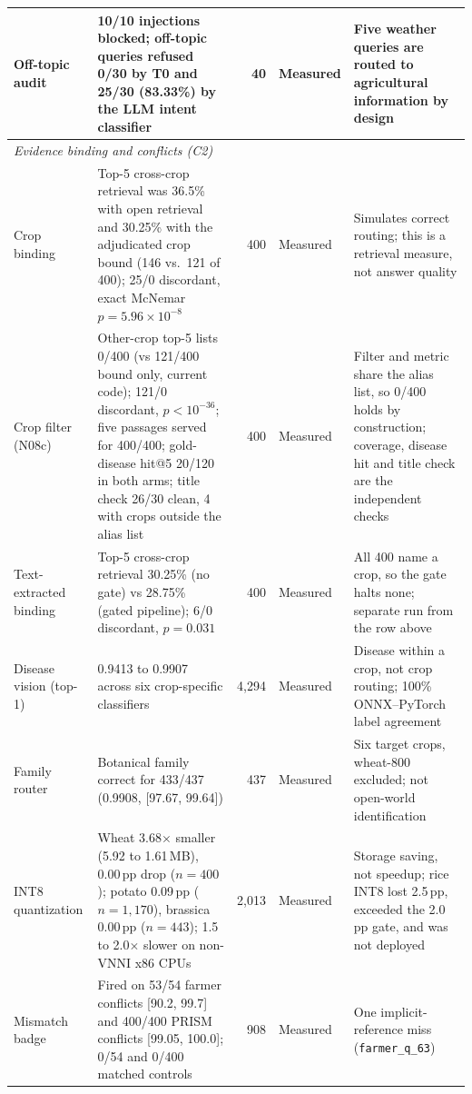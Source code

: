 \documentclass[11pt,a4paper]{article}
\begin{document}
\begin{minipage}{\textwidth}
\begin{tabularx}{\textwidth}{@{}p{} p{} r p{} X@{}}
Off-topic audit & 10/10 injections blocked; off-topic queries refused 0/30 by T0 and 25/30 (83.33\%) by the LLM intent classifier & 40 & Measured & Five weather queries are routed to agricultural information by design \\
\midrule
\multicolumn{5}{l}{\textit{Evidence binding and conflicts (C2)}} \\
Crop binding & Top-5 cross-crop retrieval was 36.5\% with open retrieval and 30.25\% with the adjudicated crop bound (146 vs.\ 121 of 400); 25/0 discordant, exact McNemar $p=5.96\times10^{-8}$ & 400 & Measured & Simulates correct routing; this is a retrieval measure, not answer quality \\
Crop filter (N08c) & Other-crop top-5 lists 0/400 (vs 121/400 bound only, current code); 121/0 discordant, $p < 10^{-36}$; five passages served for 400/400; gold-disease hit@5 20/120 in both arms; title check 26/30 clean, 4 with crops outside the alias list & 400 & Measured & Filter and metric share the alias list, so 0/400 holds by construction; coverage, disease hit and title check are the independent checks \\
Text-extracted binding & Top-5 cross-crop retrieval 30.25\% (no gate) vs 28.75\% (gated pipeline); 6/0 discordant, $p = 0.031$ & 400 & Measured & All 400 name a crop, so the gate halts none; separate run from the row above \\
Disease vision (top-1) & 0.9413 to 0.9907 across six crop-specific classifiers & 4,294 & Measured & Disease within a crop, not crop routing; 100\% ONNX--PyTorch label agreement \\
Family router & Botanical family correct for 433/437 (0.9908, [97.67, 99.64]) & 437 & Measured & Six target crops, wheat-800 excluded; not open-world identification \\
INT8 quantization & Wheat 3.68$\times$ smaller (5.92 to 1.61\,MB), 0.00\,pp drop ($n=400$); potato 0.09\,pp ($n=1{,}170$), brassica 0.00\,pp ($n=443$); 1.5 to 2.0$\times$ slower on non-VNNI x86 CPUs & 2,013 & Measured & Storage saving, not speedup; rice INT8 lost 2.5\,pp, exceeded the 2.0\,pp gate, and was not deployed \\
Mismatch badge & Fired on 53/54 farmer conflicts [90.2, 99.7] and 400/400 PRISM conflicts [99.05, 100.0]; 0/54 and 0/400 matched controls & 908 & Measured & One implicit-reference miss (\texttt{farmer\_q\_63}) \\
\bottomrule
\end{tabularx}
\label{tab:evidence_a}


\end{minipage}
\end{document}
